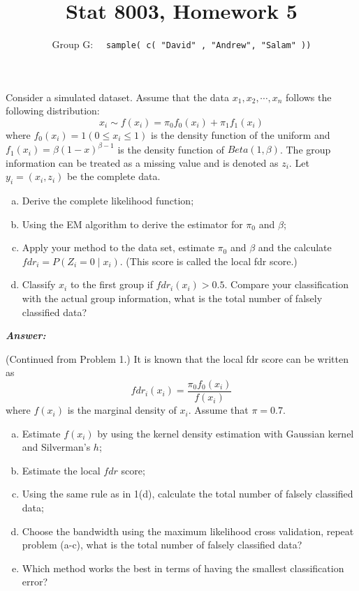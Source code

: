 \documentclass[12pt]{article}
\newenvironment{question}[2][Question]{\begin{trivlist}
\item[\hskip \labelsep {\bfseries #1}\hskip \labelsep {\bfseries #2.}]}{\end{trivlist}}
\begin{document}
 \renewcommand{\arraystretch}{1.3}

 
\title{Stat 8003, Homework 5}%
\author{Group G: \ \ \texttt{sample( c( "David" , "Andrew",  "Salam" ))}
\\ %
} %
 
\maketitle
 
 \begin{question}{4.1}  
 
 Consider a simulated dataset. Assume that the data $x_1, x_2, \cdots , x_n$ follows the following distribution:
 $$
 x_i \sim f(x_i) = \pi_0 f_0(x_i) + \pi_1 f_1(x_i)
 $$
 where $f_0(x_i) = 1(0 \leq x_i \leq 1)$ is the density function of the uniform and $f_1(x_i) = \beta (1 - x)^{\beta - 1} $ is the density function of $Beta(1, \beta)$. The group information can be treated as a
missing value and is denoted as $z_i$. Let $y_i = (x_i, z_i)$ be the complete data.	
 \begin{enumerate}[(a)]
\item Derive the complete likelihood function;
\item Using the EM algorithm to derive the estimator for $\pi_0$ and $\beta$;
\item Apply your method to the data set, estimate $\pi_0$ and $\beta$ and the calculate $fdr_i = P(Z_i = 0 \mid x_i)$. (This score is called the local fdr score.)
\item Classify $x_i$ to the first group if $fdr_i(x_i) > 0.5$. Compare your classification with the actual
group information, what is the total number of falsely classified data?
\end{enumerate}
\end{question} 


  \textbf{\color{TealBlue}\emph{Answer:} } 
\bigskip
\bigskip
 \begin{question}{4.2} (Continued from Problem 1.)  It is known that the local fdr score can be written as 
$$
fdr_i(x_i) = \frac{\pi_0 f_0(x_i)} {f(x_i)}
$$
where $f(x_i)$ is the marginal density of $x_i$. Assume that $\pi = 0.7$.
 \begin{enumerate}[(a)]
\item Estimate $f(x_i)$ by using the kernel density estimation with Gaussian kernel and Silverman's $h$;
\item Estimate the local $fdr$ score;
\item  Using the same rule as in 1(d), calculate the total number of falsely classified data;
\item Choose the bandwidth using the maximum likelihood cross validation, repeat problem (a-c),
what is the total number of falsely classified data?
\item Which method works the best in terms of having the smallest classification error?
\end{enumerate}
\end{question} 
\end{document}
